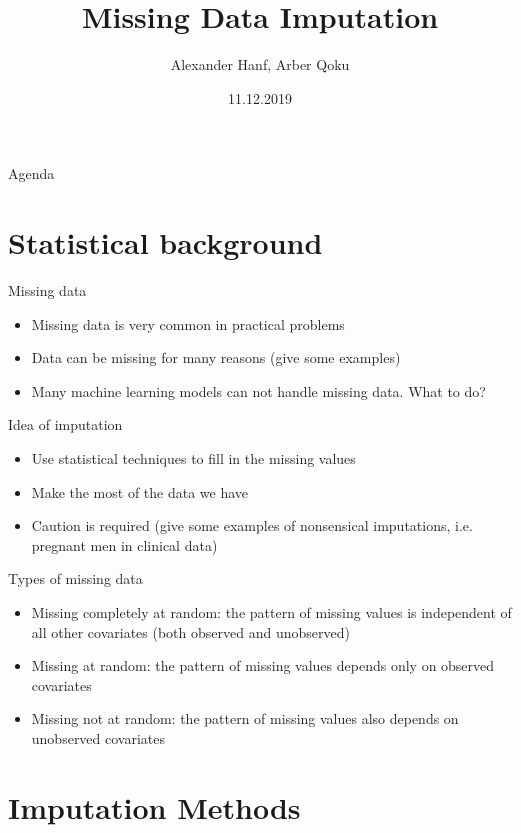 \documentclass[aspectratio=43]{beamer}
\title{Missing Data Imputation}
\date{11.12.2019}
\author{Alexander Hanf, Arber Qoku}
\begin{document}
%
\maketitle

\begin{frame}{Agenda}
\tableofcontents
\end{frame}

\section{Statistical background}

\begin{frame}{Missing data}
\begin{itemize}
\item Missing data is very common in practical problems
\item Data can be missing for many reasons (give some examples)
\item Many machine learning models can not handle missing data. What to do?
\end{itemize}
\end{frame}

\begin{frame}{Idea of imputation}
\begin{itemize}
\item Use statistical techniques to fill in the missing values
\item Make the most of the data we have
\item Caution is required (give some examples of nonsensical imputations, i.e. pregnant men in clinical data)
\end{itemize}
\end{frame}


\begin{frame}{Types of missing data}
\begin{itemize}
\item Missing completely at random: the pattern of missing values is independent of all other covariates (both observed and unobserved)
\item Missing at random: the pattern of missing values depends only on observed covariates
\item Missing not at random: the pattern of missing values also depends on unobserved covariates
\end{itemize}
\end{frame}


\section{Imputation Methods}
\end{document}
